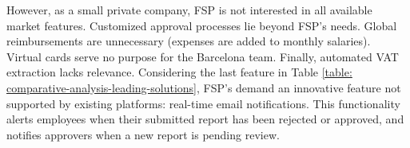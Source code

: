 However, as a small private company, FSP is not interested in all available market features. Customized approval processes lie beyond FSP's needs. Global reimbursements are unnecessary (expenses are added to monthly salaries). Virtual cards serve no purpose for the Barcelona team. Finally, automated VAT extraction lacks relevance.
\newpage
Considering the last feature in Table \ref{table: comparative-analysis-leading-solutions}, FSP's demand an innovative feature not supported by existing platforms: real-time email notifications. This functionality alerts employees when their submitted report has been rejected or approved, and notifies approvers when a new report is pending review. 

\vspace{-5pt}

